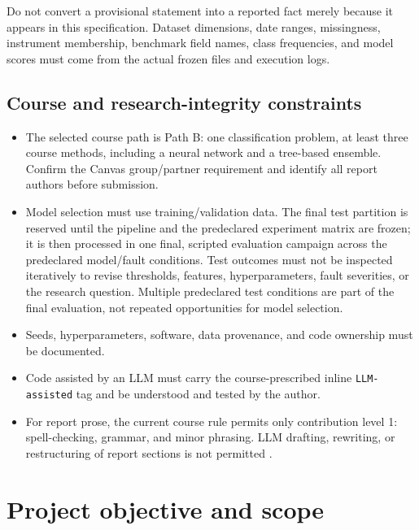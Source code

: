 \documentclass[11pt,a4paper]{article}
\begin{document}
\begin{warningbox}
Do not convert a provisional statement into a reported fact merely because it appears in this specification. Dataset dimensions, date ranges, missingness, instrument membership, benchmark field names, class frequencies, and model scores must come from the actual frozen files and execution logs.
\end{warningbox}

\subsection{Course and research-integrity constraints}

\begin{itemize}
  \item The selected course path is Path B: one classification problem, at least three course methods, including a neural network and a tree-based ensemble. Confirm the Canvas group/partner requirement and identify all report authors before submission.
  \item Model selection must use training/validation data. The final test partition is reserved until the pipeline and the predeclared experiment matrix are frozen; it is then processed in one final, scripted evaluation campaign across the predeclared model/fault conditions. Test outcomes must not be inspected iteratively to revise thresholds, features, hyperparameters, fault severities, or the research question. Multiple predeclared test conditions are part of the final evaluation, not repeated opportunities for model selection.
  \item Seeds, hyperparameters, software, data provenance, and code ownership must be documented.
  \item Code assisted by an LLM must carry the course-prescribed inline \texttt{LLM-assisted} tag and be understood and tested by the author.
  \item For report prose, the current course rule permits only contribution level 1: spell-checking, grammar, and minor phrasing. LLM drafting, rewriting, or restructuring of report sections is not permitted \cite{UiOProject3}.
\end{itemize}

\section{Project objective and scope}
\label{sec:objective}
\end{document}
